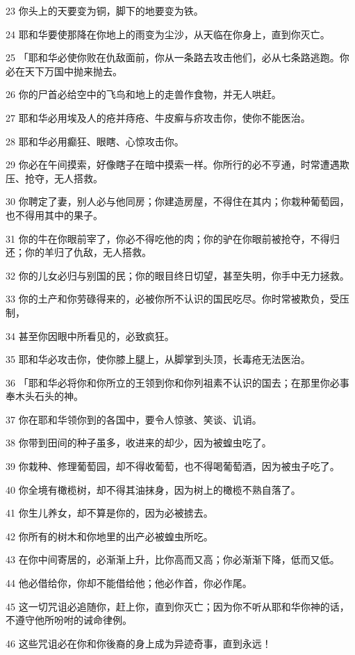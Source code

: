 \par 23 你头上的天要变为铜，脚下的地要变为铁。
\par 24 耶和华要使那降在你地上的雨变为尘沙，从天临在你身上，直到你灭亡。
\par 25 「耶和华必使你败在仇敌面前，你从一条路去攻击他们，必从七条路逃跑。你必在天下万国中抛来抛去。
\par 26 你的尸首必给空中的飞鸟和地上的走兽作食物，并无人哄赶。
\par 27 耶和华必用埃及人的疮并痔疮、牛皮癣与疥攻击你，使你不能医治。
\par 28 耶和华必用癫狂、眼瞎、心惊攻击你。
\par 29 你必在午间摸索，好像瞎子在暗中摸索一样。你所行的必不亨通，时常遭遇欺压、抢夺，无人搭救。
\par 30 你聘定了妻，别人必与他同房；你建造房屋，不得住在其内；你栽种葡萄园，也不得用其中的果子。
\par 31 你的牛在你眼前宰了，你必不得吃他的肉；你的驴在你眼前被抢夺，不得归还；你的羊归了仇敌，无人搭救。
\par 32 你的儿女必归与别国的民；你的眼目终日切望，甚至失明，你手中无力拯救。
\par 33 你的土产和你劳碌得来的，必被你所不认识的国民吃尽。你时常被欺负，受压制，
\par 34 甚至你因眼中所看见的，必致疯狂。
\par 35 耶和华必攻击你，使你膝上腿上，从脚掌到头顶，长毒疮无法医治。
\par 36 「耶和华必将你和你所立的王领到你和你列祖素不认识的国去；在那里你必事奉木头石头的神。
\par 37 你在耶和华领你到的各国中，要令人惊骇、笑谈、讥诮。
\par 38 你带到田间的种子虽多，收进来的却少，因为被蝗虫吃了。
\par 39 你栽种、修理葡萄园，却不得收葡萄，也不得喝葡萄酒，因为被虫子吃了。
\par 40 你全境有橄榄树，却不得其油抹身，因为树上的橄榄不熟自落了。
\par 41 你生儿养女，却不算是你的，因为必被掳去。
\par 42 你所有的树木和你地里的出产必被蝗虫所吃。
\par 43 在你中间寄居的，必渐渐上升，比你高而又高；你必渐渐下降，低而又低。
\par 44 他必借给你，你却不能借给他；他必作首，你必作尾。
\par 45 这一切咒诅必追随你，赶上你，直到你灭亡；因为你不听从耶和华你神的话，不遵守他所吩咐的诫命律例。
\par 46 这些咒诅必在你和你後裔的身上成为异迹奇事，直到永远！
